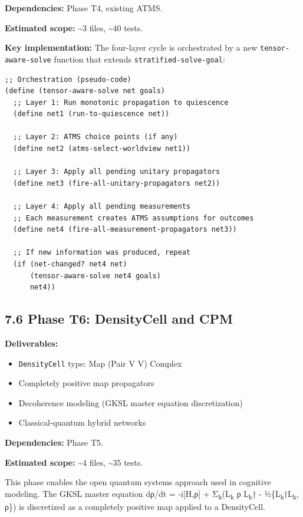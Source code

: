 \documentclass[11pt]{article}
\begin{document}
\textbf{Dependencies:} Phase T4, existing ATMS.

\textbf{Estimated scope:} \textasciitilde{}3 files, \textasciitilde{}40 tests.

\textbf{Key implementation:} The four-layer cycle is orchestrated by a new
\texttt{tensor-aware-solve} function that extends \texttt{stratified-solve-goal}:

\begin{verbatim}
;; Orchestration (pseudo-code)
(define (tensor-aware-solve net goals)
  ;; Layer 1: Run monotonic propagation to quiescence
  (define net1 (run-to-quiescence net))

  ;; Layer 2: ATMS choice points (if any)
  (define net2 (atms-select-worldview net1))

  ;; Layer 3: Apply all pending unitary propagators
  (define net3 (fire-all-unitary-propagators net2))

  ;; Layer 4: Apply all pending measurements
  ;; Each measurement creates ATMS assumptions for outcomes
  (define net4 (fire-all-measurement-propagators net3))

  ;; If new information was produced, repeat
  (if (net-changed? net4 net)
      (tensor-aware-solve net4 goals)
      net4))
\end{verbatim}
\subsection{7.6 Phase T6: DensityCell and CPM}
\label{sec:org110f8e2}

\textbf{Deliverables:}
\begin{itemize}
\item \texttt{DensityCell} type: Map (Pair V V) Complex
\item Completely positive map propagators
\item Decoherence modeling (GKSL master equation discretization)
\item Classical-quantum hybrid networks
\end{itemize}

\textbf{Dependencies:} Phase T5.

\textbf{Estimated scope:} \textasciitilde{}4 files, \textasciitilde{}35 tests.

This phase enables the open quantum systems approach used in cognitive modeling.
The GKSL master equation dρ/dt = -i[H,ρ] + Σ\textsubscript{k}(L\textsubscript{k} ρ L\textsubscript{k}† - ½\{L\textsubscript{k}†L\textsubscript{k}, ρ\})
is discretized as a completely positive map applied to a DensityCell.
\end{document}
